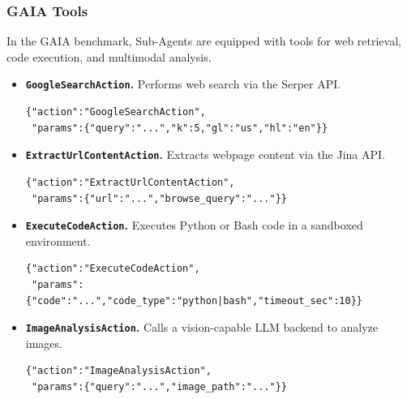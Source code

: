\subsubsection{GAIA Tools}

In the GAIA benchmark, Sub-Agents are equipped with tools for web retrieval, code execution, and multimodal analysis.

\begin{itemize}
\item \textbf{\texttt{GoogleSearchAction}.} Performs web search via the Serper API.
\begin{tcolorbox}[colback=gray!5,colframe=gray!70,arc=0mm,boxrule=1pt]
\begin{verbatim}
{"action":"GoogleSearchAction",
 "params":{"query":"...","k":5,"gl":"us","hl":"en"}}
\end{verbatim}
\end{tcolorbox}

\item \textbf{\texttt{ExtractUrlContentAction}.} Extracts webpage content via the Jina API.
\begin{tcolorbox}[colback=gray!5,colframe=gray!70,arc=0mm,boxrule=1pt]
\begin{verbatim}
{"action":"ExtractUrlContentAction",
 "params":{"url":"...","browse_query":"..."}}
\end{verbatim}
\end{tcolorbox}

\item \textbf{\texttt{ExecuteCodeAction}.} Executes Python or Bash code in a sandboxed environment.
\begin{tcolorbox}[colback=gray!5,colframe=gray!70,arc=0mm,boxrule=1pt]
\begin{verbatim}
{"action":"ExecuteCodeAction",
 "params":{"code":"...","code_type":"python|bash","timeout_sec":10}}
\end{verbatim}
\end{tcolorbox}

\item \textbf{\texttt{ImageAnalysisAction}.} Calls a vision-capable LLM backend to analyze images.
\begin{tcolorbox}[colback=gray!5,colframe=gray!70,arc=0mm,boxrule=1pt]
\begin{verbatim}
{"action":"ImageAnalysisAction",
 "params":{"query":"...","image_path":"..."}}
\end{verbatim}
\end{tcolorbox}


\end{itemize}
